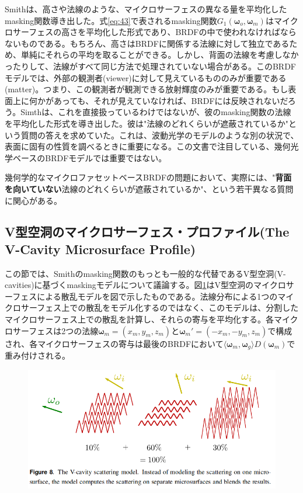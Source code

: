 \documentclass[a4j,xelatex,ja=standard]{bxjsarticle}
\begin{document}
Smithは、高さや法線のような、マイクロサーフェスの異なる量を平均化したmasking関数導き出した。式\eqref{eq:43}で表されるmasking関数$G_1(\boldsymbol{\omega}_o, \boldsymbol{\omega}_m)$はマイクロサーフェスの高さを平均化した形式であり、BRDFの中で使われなければならないものである。もちろん、高さはBRDFに関係する法線に対して独立であるため、単純にそれらの平均を取ることができる。しかし、背面の法線を考慮しなかったりして、法線がすべて同じ方法で処理されていない場合がある。このBRDFモデルでは、外部の観測者(viewer)に対して見えているもののみが重要である(matter)。つまり、この観測者が観測できる放射輝度のみが重要である。もし表面上に何かがあっても、それが見えていなければ、BRDFには反映されないだろう。Simthは、これを直接扱っているわけではないが、彼のmasking関数の法線を平均化した形式を導き出した。彼は"法線のどれくらいが遮蔽されているか"という質問の答えを求めていた。これは、波動光学のモデルのような別の状況で、表面に固有の性質を調べるときに重要になる。この文書で注目している、幾何光学ベースのBRDFモデルでは重要ではない。

幾何学的なマイクロファセットベースBRDFの問題において、実際には、"\textbf{背面を向いていない}法線のどれくらいが遮蔽されているか"、という若干異なる質問に関心がある。

\subsection{V型空洞のマイクロサーフェス・プロファイル(The V-Cavity Microsurface Profile)}

この節では、Smithのmasking関数のもっとも一般的な代替であるV型空洞(V-cavities)に基づくmaskingモデルについて議論する。図\ref{fig:8}はV型空洞のマイクロサーフェスによる散乱モデルを図で示したものである。法線分布による1つのマイクロサーフェス上での散乱をモデル化するのではなく、このモデルは、分割したマイクロサーフェス上での散乱を計算し、それらの寄与を平均化する。各マイクロサーフェスは2つの法線$\boldsymbol{\omega}_m = (x_m, y_m, z_m)$と$\boldsymbol{\omega}_m' = (-x_m, -y_m, z_m)$で構成され、各マイクロサーフェスの寄与は最後のBRDFにおいて$\langle \boldsymbol{\omega}_m, \boldsymbol{\omega}_g \rangle D(\boldsymbol{\omega}_m)$で重み付けされる。

\begin{figure}
    \includegraphics[width=\textwidth]{Figure8.png}
    \caption{}
    \label{fig:8}
\end{figure}
\end{document}
